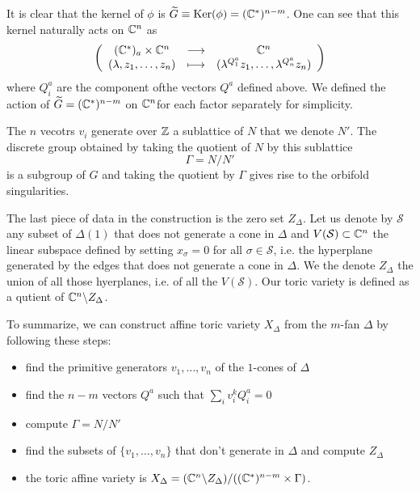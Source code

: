             It is clear that the kernel of $\phi$ is $\widetilde{G}\equiv\text{Ker}(\phi)=(\mathbb{C}^*)^{n-m}$.  One can see that this kernel naturally acts on $\mathbb{C}^n$ as
            \begin{equation}
                \left(
                \begin{array}{ccc}
                    (\mathbb{C}^*)_a\times\mathbb{C}^n & \longrightarrow & \mathbb{C}^n \\
                    (\lambda,z_1,\dots,z_n) & \longmapsto & (\lambda^{Q^a_1} z_1,\dots,\lambda^{Q^a_n} z_n)
                \end{array}
                \right)
            \end{equation}
            where $Q^a_i$ are the component ofthe vectors $Q^a$ defined above. We defined the action of $\widetilde{G}=(\mathbb{C}^*)^{n-m}$ on $\mathbb{C}^n$for each factor separately for simplicity.

            The $n$ vecotrs $v_i$ generate over $\mathbb{Z}$ a sublattice of $N$ that we denote $N'$. The discrete group obtained by taking the quotient of $N$ by this sublattice
            \begin{equation}
                \Gamma=N/N'
            \end{equation}
            is a subgroup of $G$ and taking the quotient by $\Gamma$ gives rise to the orbifold singularities.

            The last piece of data in the construction is the zero set $Z_\Delta$. Let us denote by $\mathcal{S}$ any subset of $\Delta(1)$ that does not generate a cone in $\Delta$ and $V(\mathcal{S})\subset\mathbb{C}^n$ the linear subspace defined by setting $x_\sigma=0$ for all $\sigma\in\mathcal{S}$, i.e. the hyperplane generated by the edges that does not generate a cone in $\Delta$. We the denote $Z_\Delta$ the union of all those hyerplanes, i.e. of all the $V(\mathcal{S})$. Our toric variety is defined as a qutient of $\mathbb{C}^n\backslash Z_\Delta$.

            To summarize, we can construct affine toric variety $X_\Delta$ from the $m$-fan $\Delta$ by following these steps:
            \begin{itemize}
                \item find the primitive generators $v_1,\dots,v_n$ of the $1$-cones of $\Delta$
                \item find the $n-m$ vectors $Q^a$ such that $\sum_iv^k_i Q^a_i=0$
                \item compute $\Gamma=N/N'$
                \item find the subsets of $\{v_1,\dots,v_n\}$ that don't generate in $\Delta$ and compute $Z_\Delta$
                \item the toric affine variety is $X_\Delta=(\mathbb{C}^n\backslash Z_\Delta)/((\mathbb{C}^*)^{n-m}\times\Gamma)$.
            \end{itemize}

